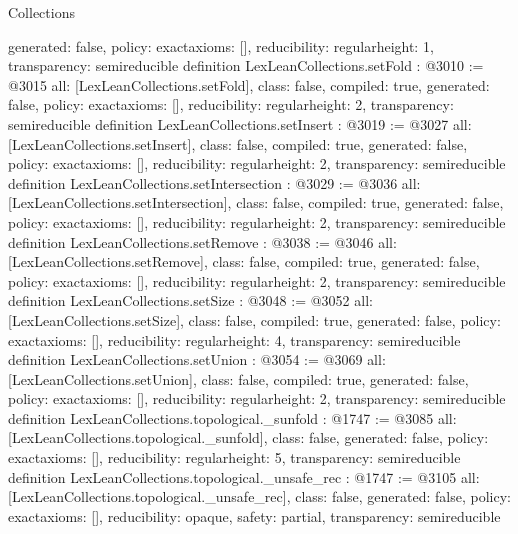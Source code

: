 \begin{lexlean}{Collections}
\begin{coremodule}
{  generated: false,
  policy: exact{axioms: []},
  reducibility: regular{height: 1},
  transparency: semireducible
}
definition LexLeanCollections.setFold : @3010 := @3015 {
  all: [LexLeanCollections.setFold],
  class: false,
  compiled: true,
  generated: false,
  policy: exact{axioms: []},
  reducibility: regular{height: 2},
  transparency: semireducible
}
definition LexLeanCollections.setInsert : @3019 := @3027 {
  all: [LexLeanCollections.setInsert],
  class: false,
  compiled: true,
  generated: false,
  policy: exact{axioms: []},
  reducibility: regular{height: 2},
  transparency: semireducible
}
definition LexLeanCollections.setIntersection : @3029 := @3036 {
  all: [LexLeanCollections.setIntersection],
  class: false,
  compiled: true,
  generated: false,
  policy: exact{axioms: []},
  reducibility: regular{height: 2},
  transparency: semireducible
}
definition LexLeanCollections.setRemove : @3038 := @3046 {
  all: [LexLeanCollections.setRemove],
  class: false,
  compiled: true,
  generated: false,
  policy: exact{axioms: []},
  reducibility: regular{height: 2},
  transparency: semireducible
}
definition LexLeanCollections.setSize : @3048 := @3052 {
  all: [LexLeanCollections.setSize],
  class: false,
  compiled: true,
  generated: false,
  policy: exact{axioms: []},
  reducibility: regular{height: 4},
  transparency: semireducible
}
definition LexLeanCollections.setUnion : @3054 := @3069 {
  all: [LexLeanCollections.setUnion],
  class: false,
  compiled: true,
  generated: false,
  policy: exact{axioms: []},
  reducibility: regular{height: 2},
  transparency: semireducible
}
definition LexLeanCollections.topological._sunfold : @1747 := @3085 {
  all: [LexLeanCollections.topological._sunfold],
  class: false,
  generated: false,
  policy: exact{axioms: []},
  reducibility: regular{height: 5},
  transparency: semireducible
}
definition LexLeanCollections.topological._unsafe_rec : @1747 := @3105 {
  all: [LexLeanCollections.topological._unsafe_rec],
  class: false,
  generated: false,
  policy: exact{axioms: []},
  reducibility: opaque{},
  safety: partial,
  transparency: semireducible
}


\end{coremodule}
\end{lexlean}
